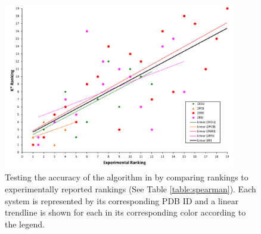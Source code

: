 \begin{figure}
\center
\includegraphics[width=0.9\textwidth]{figures/Rankings.png}
\caption{Testing the accuracy of the \ks algorithm in  by comparing \ks rankings to experimentally reported rankings (See Table \ref{table:spearman}). Each system is represented by its corresponding PDB ID and a linear trendline is shown for each in its corresponding color according to the legend.}
\label{fig:rankings}
\end{figure}

